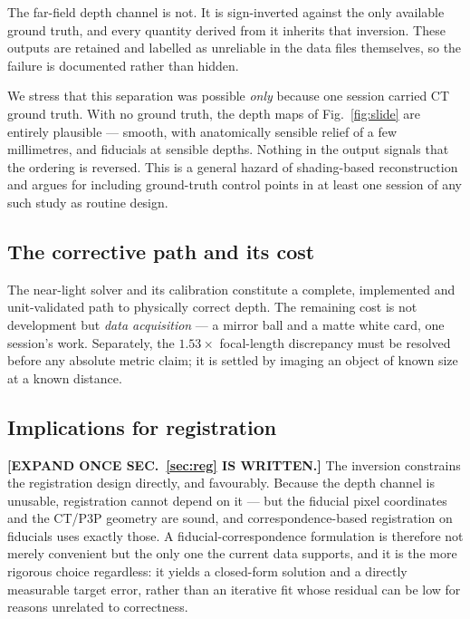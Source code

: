\documentclass[journal,10pt]{IEEEtran}
\newcommand{\TODO}[1]{\textcolor{todoRed}{\textbf{[#1]}}}
\begin{document}
The far-field depth channel is not. It is sign-inverted against the only
available ground truth, and every quantity derived from it inherits that
inversion. These outputs are retained and labelled as unreliable in the data
files themselves, so the failure is documented rather than hidden.

We stress that this separation was possible \emph{only} because one session
carried CT ground truth. With no ground truth, the depth maps of
Fig.~\ref{fig:slide} are entirely plausible --- smooth, with anatomically
sensible relief of a few millimetres, and fiducials at sensible depths. Nothing
in the output signals that the ordering is reversed. This is a general hazard of
shading-based reconstruction and argues for including ground-truth control points
in at least one session of any such study as routine design.

\subsection{The corrective path and its cost}
The near-light solver and its calibration constitute a complete, implemented and
unit-validated path to physically correct depth. The remaining cost is not
development but \emph{data acquisition} --- a mirror ball and a matte white card,
one session's work. Separately, the $1.53\times$ focal-length discrepancy must be
resolved before any absolute metric claim; it is settled by imaging an object of
known size at a known distance.

\subsection{Implications for registration}
\TODO{EXPAND ONCE SEC.~\ref{sec:reg} IS WRITTEN.} The inversion constrains the
registration design directly, and favourably. Because the depth channel is
unusable, registration cannot depend on it --- but the fiducial pixel coordinates
and the CT/P3P geometry are sound, and correspondence-based registration on
fiducials uses exactly those. A fiducial-correspondence formulation is therefore
not merely convenient but the only one the current data supports, and it is the
more rigorous choice regardless: it yields a closed-form solution and a directly
measurable target error, rather than an iterative fit whose residual can be low
for reasons unrelated to correctness.
\end{document}
